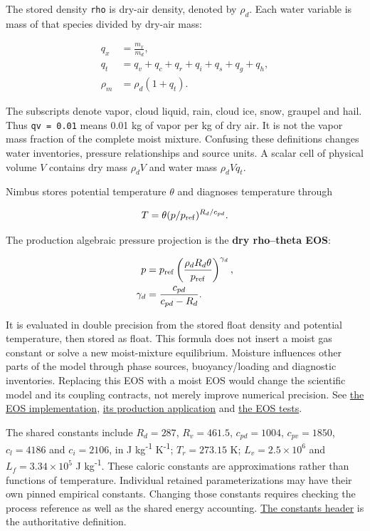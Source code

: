 \documentclass[
  11pt,
]{report}
\begin{document}
The stored density \texttt{rho} is dry-air density, denoted by
\(\rho_d\). Each water variable is mass of that species divided by
dry-air mass:

\[\begin{aligned}
q_x &= \frac{m_x}{m_d}, \\
q_t &= q_v+q_c+q_r+q_i+q_s+q_g+q_h, \\
\rho_m &= \rho_d(1+q_t).
\end{aligned}\]

The subscripts denote vapor, cloud liquid, rain, cloud ice, snow,
graupel and hail. Thus \texttt{qv\ =\ 0.01} means 0.01 kg of vapor per
kg of dry air. It is not the vapor mass fraction of the complete moist
mixture. Confusing these definitions changes water inventories, pressure
relationships and source units. A scalar cell of physical volume \(V\)
contains dry mass \(\rho_d V\) and water mass \(\rho_d Vq_t\).

Nimbus stores potential temperature \(\theta\) and diagnoses temperature
through

\[T=\theta(p/p_{\rm ref})^{R_d/c_{pd}}.\]

The production algebraic pressure projection is the \textbf{dry
rho--theta EOS}:

\[\begin{aligned}
p &= p_{\rm ref}
\left(\frac{\rho_dR_d\theta}{p_{\rm ref}}\right)^{\gamma_d}, \\
\gamma_d &= \frac{c_{pd}}{c_{pd}-R_d}.
\end{aligned}\]

It is evaluated in double precision from the stored float density and
potential temperature, then stored as float. This formula does not
insert a moist gas constant or solve a new moist-mixture equilibrium.
Moisture influences other parts of the model through phase sources,
buoyancy/loading and diagnostic inventories. Replacing this EOS with a
moist EOS would change the scientific model and its coupling contracts,
not merely improve numerical precision. See
\href{../include/dynamics/eos_pressure.hpp}{the EOS implementation},
\href{../src/core/orchestration/dynamics/eos_apply.cpp}{its production
application} and \href{../tests/core/test_eos_pressure.cpp}{the EOS
tests}.

The shared constants include \(R_d=287\), \(R_v=461.5\),
\(c_{pd}=1004\), \(c_{pv}=1850\), \(c_l=4186\) and \(c_i=2106\), in J
kg\textsuperscript{-1} K\textsuperscript{-1}; \(T_r=273.15\) K; \(L_v=2.5\times10^6\) and
\(L_f=3.34\times10^5\) J kg\textsuperscript{-1}. These caloric constants are
approximations rather than functions of temperature. Individual retained
parameterizations may have their own pinned empirical constants.
Changing those constants requires checking the process reference as well
as the shared energy accounting.
\href{../include/core/infra/physical_constants.hpp}{The constants
header} is the authoritative definition.
\end{document}
